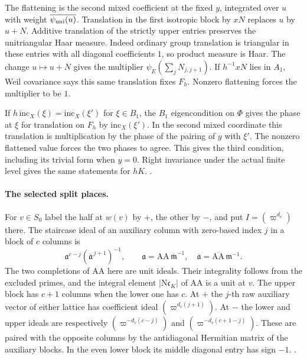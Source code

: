 The flattening is the second mixed coefficient at the
fixed \(y\), integrated over \(u\) with weight
\(\overline{\psi_{\rm uni}(u)}\). Translation in the
first isotropic block by \(xN\) replaces \(u\) by
\(u+N\). Additive translation of the strictly upper
entries preserves the unitriangular Haar measure. Indeed
ordinary group translation is triangular in these entries
with all diagonal coefficients \(1\), so product measure
is Haar. The change \(u\mapsto u+N\) gives the multiplier
\(\psi_E(\sum_j N_{j,j+1})\). If \(h^{-1}xN\) lies in
\(A_1\), Weil covariance says this same translation
fixes \(F_h\). Nonzero flattening forces the multiplier
to be \(1\).

If \(h\,\mathrm{inc}_X(\xi)=\mathrm{inc}_X(\xi')\)
for \(\xi\in B_1\), the \(B_1\) eigencondition on
\(\Phi\) gives the phase at \(\xi\) for translation on
\(F_h\) by \(\mathrm{inc}_X(\xi')\). In the second
mixed coordinate this translation is multiplication
by the phase of the pairing of \(y\) with \(\xi'\).
The nonzero flattened value forces the two phases
to agree. This gives the third condition, including its
trivial form when \(y=0\). Right invariance under the
actual finite level gives the same statements for \(hK\).
.

\paragraph{The selected split places.}
For \(v\in S_0\) label the half at \(w(v)\) by \(+\),
the other by \(-\), and put \(I=(\varpi^{d_v})\) there.
The staircase ideal of an auxiliary column with
zero-based index \(j\) in a block of \(c\) columns
is
\[
 \mathfrak a^{c-j}(\overline{\mathfrak a}^{\,j+1})^{-1},
 \qquad
 \mathfrak a=\mathrm{AA}\,\overline{\mathfrak m}^{-1},
 \quad \overline{\mathfrak a}
       =\overline{\mathrm{AA}}\,\mathfrak m^{-1}.
\]
The two completions of \(\mathrm{AA}\) here are unit
ideals. Their integrality follows from the excluded
primes, and the integral element
\(\lvert\mathrm N\mathfrak c_{\!K}\rvert\) of
\(\mathrm{AA}\) is a unit at \(v\). The upper block
has \(c+1\) columns when the lower one has \(c\).
At \(+\) the \(j\)-th raw auxiliary vector of either
lattice has coefficient ideal \((\varpi^{d_v(j+1)})\).
At \(-\) the lower and upper ideals are respectively
\((\varpi^{-d_v(c-j)})\) and
\((\varpi^{-d_v(c+1-j)})\). These are paired with
the opposite columns by the antidiagonal Hermitian
matrix of the auxiliary blocks. In the even lower block its
middle diagonal entry has sign \(-1\).
.

